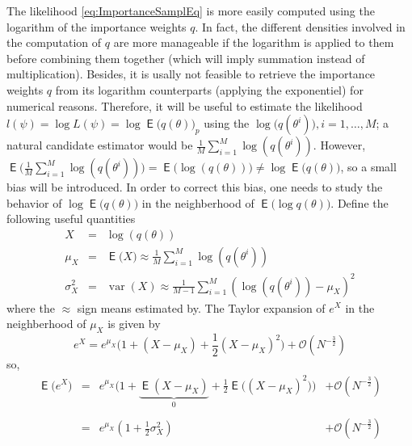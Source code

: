 \documentclass{article}
\DeclareMathOperator{\var}{var}
\DeclareMathOperator{\E}{\mathsf{E}}
\begin{document}
The likelihood \eqref{eq:ImportanceSamplEq} is more easily computed using the logarithm of
the importance weights $q$. In fact, the different densities involved in the computation of
$q$ are more manageable if the logarithm is applied to them before combining them together
(which will imply summation instead of multiplication). Besides, it is usally not feasible to
retrieve the importance weights $q$ from its logarithm counterparts (applying the
exponentiel) for numerical reasons. Therefore, it will be useful to estimate the likelihood
$ l(\psi)= \log L(\psi) = \log \E \Big ( q(\theta ) \Big )_p $ using the
$\log \Big ( q(\theta^i ) \Big ),i=1,\dots,M $; a natural candidate estimator would be
$ \frac{1}{M} \displaystyle \sum_{i=1}^M \log(q(\theta^i))$. However,
$ \E \Big ( \frac{1}{M} \displaystyle \sum_{i=1}^M \log(q(\theta^i)) \Big ) = \E \Big ( \log
(q(\theta)) \Big ) \neq \log \E \Big ( q(\theta) \Big )$, so a small bias will be
introduced. In order to correct this bias, one needs to study the behavior of
$ \log \E \Big ( q(\theta) \Big ) $ in the neighberhood of
$ \E \Big ( \log q(\theta) \Big ) $.  Define the following useful quantities
\begin{equation}
  \begin{array}{rcl}
 X & = & \log(q(\theta)) \\
 \mu_X & = & \E \Big ( X \Big ) \approx \frac{1}{M} \displaystyle \sum_{i=1}^M \log(q(\theta^i)) \\
 \sigma^2_X & = & \var (X) \approx \frac{1}{M-1} \displaystyle \sum_{i=1}^M (\log(q(\theta^i)) - \mu_X)^2
   \end{array}
   \label{eq:qtitesApproxBias}
\end{equation}
where the $\approx$ sign means estimated by. The Taylor expansion of $e^X $ in the
neighberhood of $\mu_X$ is given by
\begin{equation*}
  e^X
  = e^{\mu_X} \bigg ( 1 + (X- \mu_X) + \frac{1}{2} (X-\mu_X)^2   \bigg )  +
    \mathcal{O} (N^{-\frac{3}{2}})
\end{equation*}
so,
\begin{equation}
  \begin{array}{rccl}
   \E \Big ( e^X \Big )  & = & e^{\mu_X} \bigg (  1 + \underbrace{\E (X -\mu_X)}_{0} +  \frac{1}{2} \E \Big ((X-\mu_X)^2 \Big )  \bigg )  & + \mathcal{O} (N^{-\frac{3}{2}}) \\
   &  & \\
   & = & e^{\mu_X} (1+ \frac{1}{2} \sigma_X^2) & + \mathcal{O} (N^{-\frac{3}{2}})
   \end{array}
   \label{eq:Taylor}
\end{equation}
\end{document}
